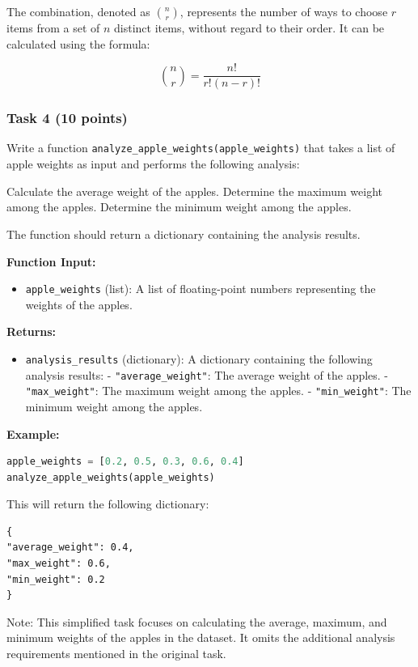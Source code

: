 \documentclass[12pt]{article}
\begin{document}
The combination, denoted as $\binom{n}{r}$, represents the number of ways to choose $r$ items from a set of $n$ distinct items, without regard to their order. It can be calculated using the formula:

\[
\binom{n}{r} = \frac{n!}{r!(n-r)!}
\]

\subsubsection{Task 4 (10 points)}

Write a function \texttt{analyze\_apple\_weights(apple\_weights)} that takes a list of apple weights as input and performs the following analysis:

    Calculate the average weight of the apples.
    Determine the maximum weight among the apples.
    Determine the minimum weight among the apples.

The function should return a dictionary containing the analysis results.

\textbf{Function Input:}
\begin{itemize}
\item \texttt{apple\_weights} (list): A list of floating-point numbers representing the weights of the apples.
\end{itemize}

\textbf{Returns:}
\begin{itemize}
\item \texttt{analysis\_results} (dictionary): A dictionary containing the following analysis results:
- \texttt{"average\_weight"}: The average weight of the apples.
- \texttt{"max\_weight"}: The maximum weight among the apples.
- \texttt{"min\_weight"}: The minimum weight among the apples.
\end{itemize}

\textbf{Example:}
\begin{lstlisting}[language=Python]
apple_weights = [0.2, 0.5, 0.3, 0.6, 0.4]
analyze_apple_weights(apple_weights)
\end{lstlisting}
This will return the following dictionary:
\begin{verbatim}
{
"average_weight": 0.4,
"max_weight": 0.6,
"min_weight": 0.2
}
\end{verbatim}

Note: This simplified task focuses on calculating the average, maximum, and minimum weights of the apples in the dataset. It omits the additional analysis requirements mentioned in the original task.
\end{document}
